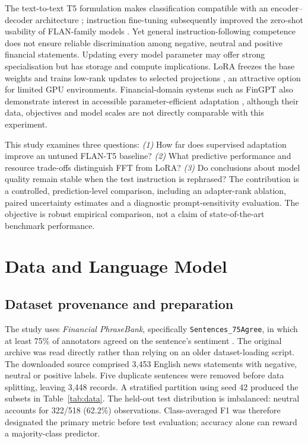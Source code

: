 \documentclass[conference,a4paper]{IEEEtran}
\begin{document}
The text-to-text T5 formulation makes classification compatible with an encoder--decoder architecture \cite{raffel2020}; instruction fine-tuning subsequently improved the zero-shot usability of FLAN-family models \cite{chung2024}. Yet general instruction-following competence does not ensure reliable discrimination among negative, neutral and positive financial statements. Updating every model parameter may offer strong specialisation but has storage and compute implications. LoRA freezes the base weights and trains low-rank updates to selected projections \cite{hu2022}, an attractive option for limited GPU environments. Financial-domain systems such as FinGPT also demonstrate interest in accessible parameter-efficient adaptation \cite{yang2023}, although their data, objectives and model scales are not directly comparable with this experiment.

This study examines three questions: \emph{(1)} How far does supervised adaptation improve an untuned FLAN-T5 baseline? \emph{(2)} What predictive performance and resource trade-offs distinguish FFT from LoRA? \emph{(3)} Do conclusions about model quality remain stable when the test instruction is rephrased? The contribution is a controlled, prediction-level comparison, including an adapter-rank ablation, paired uncertainty estimates and a diagnostic prompt-sensitivity evaluation. The objective is robust empirical comparison, not a claim of state-of-the-art benchmark performance.

\section{Data and Language Model}
\subsection{Dataset provenance and preparation}
The study uses \emph{Financial PhraseBank}, specifically \texttt{Sentences\_75Agree}, in which at least 75\% of annotators agreed on the sentence's sentiment \cite{malo2014,phrasebank}. The original archive was read directly rather than relying on an older dataset-loading script. The downloaded source comprised 3,453 English news statements with negative, neutral or positive labels. Five duplicate sentences were removed before data splitting, leaving 3,448 records. A stratified partition using seed 42 produced the subsets in Table~\ref{tab:data}. The held-out test distribution is imbalanced: neutral accounts for 322/518 (62.2\%) observations. Class-averaged F1 was therefore designated the primary metric before test evaluation; accuracy alone can reward a majority-class predictor.
\end{document}

